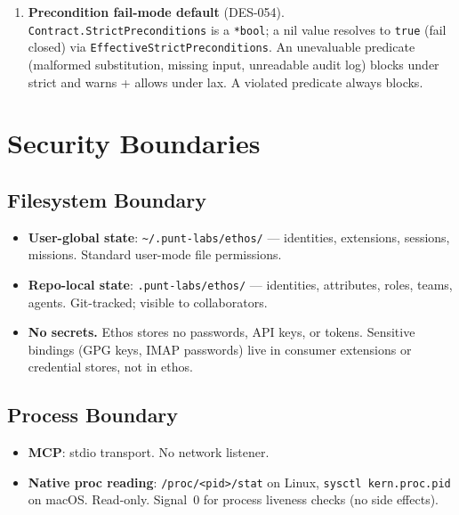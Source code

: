 \documentclass[a4paper,10pt]{article}
\newcommand{\field}[1]{\texttt{#1}}
\newcommand{\fpath}[1]{\texttt{#1}}
\begin{document}
\begin{enumerate}
  \item \textbf{Precondition fail-mode default} (DES-054).
    \field{Contract.StrictPreconditions} is a \texttt{*bool}; a
    nil value resolves to \texttt{true} (fail closed) via
    \texttt{EffectiveStrictPreconditions}.  An unevaluable
    predicate (malformed substitution, missing input, unreadable
    audit log) blocks under strict and warns + allows under lax.
    A violated predicate always blocks.
\end{enumerate}

\section{Security Boundaries}

\subsection{Filesystem Boundary}

\begin{itemize}
  \item \textbf{User-global state}: \fpath{\~{}/.punt-labs/ethos/} ---
    identities, extensions, sessions, missions.  Standard user-mode
    file permissions.
  \item \textbf{Repo-local state}: \fpath{.punt-labs/ethos/} ---
    identities, attributes, roles, teams, agents.  Git-tracked;
    visible to collaborators.
  \item \textbf{No secrets.}  Ethos stores no passwords, API keys,
    or tokens.  Sensitive bindings (GPG keys, IMAP passwords) live
    in consumer extensions or credential stores, not in ethos.
\end{itemize}

\subsection{Process Boundary}

\begin{itemize}
  \item \textbf{MCP}: stdio transport.  No network listener.
  \item \textbf{Native proc reading}: \texttt{/proc/<pid>/stat} on
    Linux, \texttt{sysctl kern.proc.pid} on macOS.  Read-only.
    Signal~0 for process liveness checks (no side effects).
\end{itemize}
\end{document}
